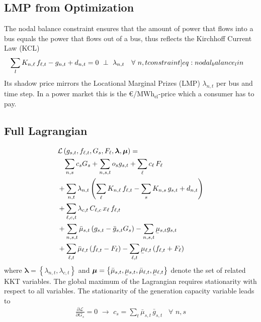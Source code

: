 \documentclass[11pt,twocolumn]{article}
\newcommand{\ubar}[1]{\underaccent{\bar}{#1}}
\newcommand{\resultsin}[1]{\hspace{6pt} \bot  \hspace{6pt} #1}
\newcommand{\Forall}[1]{\hspace{10pt} \forall \,\, #1 }
\newcommand{\pdv}[2]{\frac{\partial #1}{\partial #2}}
\newcommand{\generation}{g_{s,t}}
\newcommand{\generationpotential}{\bar{g}_{s,t}}
\newcommand{\nodalgeneration}[1][n]{g_{#1,t}}
\newcommand{\capacityGeneration}{G_{s}}
\newcommand{\capacityFlow}{F_{\ell}}
\newcommand{\capexGeneration}{c_{s}}
\newcommand{\capexFlow}{c_{\ell}}
\newcommand{\opexGeneration}{o_{s}}
\newcommand{\demand}[1][n]{d_{#1,t}}
\newcommand{\nodaldemand}[1][n]{d_{#1,t}}
\newcommand{\incidence}[1][n]{K_{#1,\ell}}
\newcommand{\incidenceGenerators}[1][n]{K_{#1,s}}
\newcommand{\mulowergeneration}{\ubar{\mu}_{s,t}}
\newcommand{\muuppergeneration}{\bar{\mu}_{s,t}}
\newcommand{\mulowerflow}{\ubar{\mu}_{\ell,t}}
\newcommand{\muupperflow}{\bar{\mu}_{\ell,t}}
\newcommand{\lmp}[1][n]{\lambda_{#1,t}}
\newcommand{\flow}{f_{\ell,t}}
\newcommand{\cycle}{C_{\ell,c}}
\newcommand{\impedance}{x_\ell}
\newcommand{\cycleprice}{\lambda_{c,t}}
\newcommand{\lagrangian}{\mathcal{L}}
\newcommand{\megawatthour}{MWh$_\text{el}$}
\begin{document}
\subsection{LMP from Optimization}
The nodal balance constraint ensures that the amount of power that flows into a bus equals the power that flows out of a bus, thus reflects the Kirchhoff Current Law (KCL)
\begin{align}
    \sum_l \incidence \, \flow  - \nodalgeneration + \nodaldemand &= 0 \resultsin{\lmp} \Forall{n,t}
    \label[constraint]{eq:nodal_balance_lin}
\end{align}
Its shadow price mirrors the Locational Marginal Prizes (LMP) $\lmp$ per bus and time step. In a power market this is the \euro/\megawatthour-price which a consumer has to pay.\\

\subsection{Full Lagrangian}
\label{sec:full_lagrangian}
\begin{align}
\notag
& \lagrangian\left(\generation, \flow, \capacityGeneration, \capacityFlow, \boldsymbol{\lambda}, \boldsymbol{\mu} \right)   =   \\  
\notag
& \;\;\; \sum_{n,s} \capexGeneration \capacityGeneration + \sum_{n, s, t} \opexGeneration \generation + \sum_{\ell} \capexFlow \, \capacityFlow  \\
\notag
&+ \sum_{n,t} \lmp \left(\sum_\ell \incidence \, \flow  - \sum_s \incidenceGenerators\, \generation +  \demand  \right)  \\ 
\notag
&+ \sum_{\ell,c,t} \cycleprice \, \cycle \, \impedance \, \flow  \\
\notag
&+ \sum_{n,s,t} \muuppergeneration \left( \generation - \generationpotential \capacityGeneration \right)  - \sum_{n,s,t} \mulowergeneration \generation  \\
&+ \sum_{\ell,t} \muupperflow \left( \flow - \capacityFlow \right) - \sum_{\ell,t} \mulowerflow \left( \flow + \capacityFlow \right)     
\label{eq:full_lagrangian}
\end{align}
% 
where $\boldsymbol{\lambda} = \left\lbrace \lmp, \cycleprice \right\rbrace $ and $\boldsymbol{\mu} = \left\lbrace \muuppergeneration, \mulowergeneration, \muupperflow, \mulowerflow \right\rbrace $ denote the set of related KKT variables. The global maximum of the Lagrangian requires stationarity with respect to all variables. The stationarity of the generation capacity variable leads to 
\begin{align}
\pdv{\lagrangian}{\capacityGeneration}  = 0 \,\, \rightarrow \,\, 
\capexGeneration =  \sum_t \muuppergeneration \, \generationpotential  \Forall{n,s}
\label{eq:capex_generation_duality}
\end{align}
\end{document}
